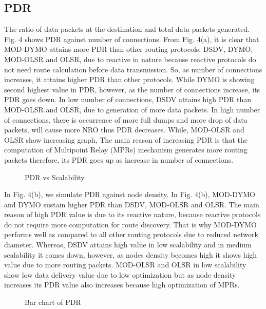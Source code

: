 \documentclass[journal]{IEEEtran}
\begin{document}
\subsection{PDR}
The ratio of data packets at the destination and total data packets generated. Fig. 4 shows PDR against number of connections. From Fig. 4(a), it is clear that MOD-DYMO attains more PDR than other routing protocols; DSDV, DYMO, MOD-OLSR and OLSR, due to reactive in nature because reactive protocols do not need route calculation before data transmission. So, as number of connections increases, it attains higher PDR than other protocols. While DYMO is showing second highest value in PDR, however, as the number of connections increase, its PDR goes down. In low number of connections, DSDV attains high PDR than MOD-OLSR and OLSR, due to generation of more data packets. In high number of connections, there is occurrence of more full dumps and more drop of data packets, will cause more NRO thus PDR decreases. While, MOD-OLSR and OLSR show increasing graph, The main reason of increasing PDR is that the computation of Multipoint Relay (MPRs) mechanism generates more routing packets therefore, its PDR goes up as increase in number of connections.
\begin{figure}[h]
  \centering
 \caption{PDR vs Scalability}
\end{figure}

In Fig. 4(b), we simulate PDR against node density. In Fig. 4(b), MOD-DYMO and DYMO sustain higher PDR than DSDV, MOD-OLSR and OLSR. The main reason of high PDR value is due to its reactive nature, because reactive protocols do not require more computation for route discovery. That is why MOD-DYMO performs well as compared to all other routing protocols due to reduced network diameter. Whereas, DSDV attains high value in low scalability and in medium scalability it comes down, however, as nodes density becomes high it shows high value due to more routing packets. MOD-OLSR and OLSR in low scalability show low data delivery value due to low optimization but as node density increases its PDR value also increases because high optimization of MPRs.
\begin{figure}[h]
  \centering
 \caption{Bar chart of PDR}
\end{figure}
\end{document}
